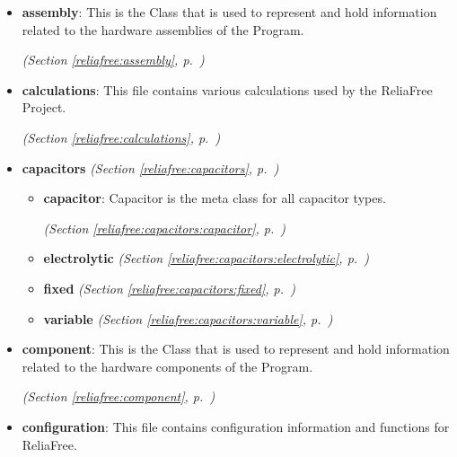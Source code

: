 \begin{itemize}
\setlength{\parskip}{0ex}
\item \textbf{assembly}: This is the Class that is used to represent and hold information related to
the hardware assemblies of the Program.



  \textit{(Section \ref{reliafree:assembly}, p.~\pageref{reliafree:assembly})}

\item \textbf{calculations}: This file contains various calculations used by the ReliaFree Project.



  \textit{(Section \ref{reliafree:calculations}, p.~\pageref{reliafree:calculations})}

\item \textbf{capacitors}
  \textit{(Section \ref{reliafree:capacitors}, p.~\pageref{reliafree:capacitors})}

  \begin{itemize}
\setlength{\parskip}{0ex}
    \item \textbf{capacitor}: Capacitor is the meta class for all capacitor types.



  \textit{(Section \ref{reliafree:capacitors:capacitor}, p.~\pageref{reliafree:capacitors:capacitor})}

    \item \textbf{electrolytic}
  \textit{(Section \ref{reliafree:capacitors:electrolytic}, p.~\pageref{reliafree:capacitors:electrolytic})}

    \item \textbf{fixed}
  \textit{(Section \ref{reliafree:capacitors:fixed}, p.~\pageref{reliafree:capacitors:fixed})}

    \item \textbf{variable}
  \textit{(Section \ref{reliafree:capacitors:variable}, p.~\pageref{reliafree:capacitors:variable})}

  \end{itemize}
\item \textbf{component}: This is the Class that is used to represent and hold information related to
the hardware components of the Program.



  \textit{(Section \ref{reliafree:component}, p.~\pageref{reliafree:component})}

\item \textbf{configuration}: This file contains configuration information and functions for ReliaFree.




\end{itemize}
